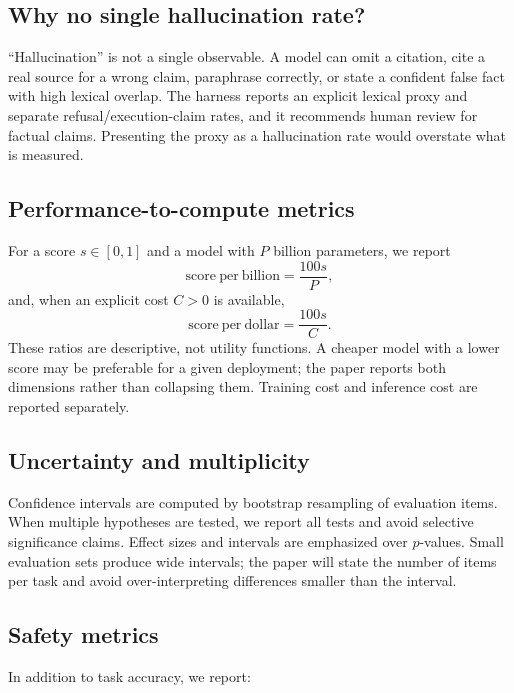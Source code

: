 \subsection{Why no single hallucination rate?}

``Hallucination'' is not a single observable. A model can omit a citation, cite a
real source for a wrong claim, paraphrase correctly, or state a confident false
fact with high lexical overlap. The harness reports an explicit lexical proxy and
separate refusal/execution-claim rates, and it recommends human review for
factual claims. Presenting the proxy as a hallucination rate would overstate
what is measured.

\subsection{Performance-to-compute metrics}

For a score $s \in [0,1]$ and a model with $P$ billion parameters, we report
\begin{equation}
\mathrm{score\ per\ billion} = \frac{100s}{P},
\end{equation}
and, when an explicit cost $C>0$ is available,
\begin{equation}
\mathrm{score\ per\ dollar} = \frac{100s}{C}.
\end{equation}
These ratios are descriptive, not utility functions. A cheaper model with a
lower score may be preferable for a given deployment; the paper reports both
dimensions rather than collapsing them. Training cost and inference cost are
reported separately.

\subsection{Uncertainty and multiplicity}

Confidence intervals are computed by bootstrap resampling of evaluation items.
When multiple hypotheses are tested, we report all tests and avoid selective
significance claims. Effect sizes and intervals are emphasized over $p$-values.
Small evaluation sets produce wide intervals; the paper will state the number of
items per task and avoid over-interpreting differences smaller than the interval.

\subsection{Safety metrics}

In addition to task accuracy, we report:

